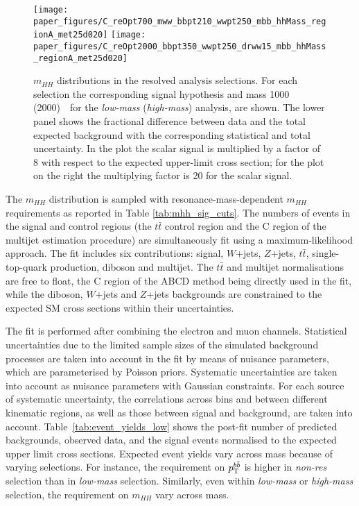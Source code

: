 \begin{figure}
\begin{center}
\texttt{[image: paper\_figures/C\_reOpt700\_mww\_bbpt210\_wwpt250\_mbb\_hhMass\_regionA\_met25d020]}
\texttt{[image: paper\_figures/C\_reOpt2000\_bbpt350\_wwpt250\_drww15\_mbb\_hhMass\_regionA\_met25d020]}
\end{center}
\caption{$m_{HH}$ distributions in the resolved analysis selections. For each selection the corresponding
 signal hypothesis and mass 1000 (2000)~\GeV\ for the  \emph{low-mass} (\emph{high-mass}) analysis, are shown.  The lower panel shows the fractional difference between data and the total expected background
 with the corresponding statistical and total uncertainty. In the plot the scalar signal is multiplied by a factor of 8 with respect to the expected upper-limit cross section;%
for the plot on the right
the multiplying factor is 20 for the scalar signal.}
\label{fig:mhh_2}
\end{figure}
 
 
The $m_{HH}$ distribution is sampled with resonance-mass-dependent
$m_{HH}$ requirements as reported in Table \ref{tab:mhh_sig_cuts}.
The numbers of events in the signal and control regions (the $t\bar{t}$
control region and the C region of the multijet estimation procedure) are
simultaneously fit using a  maximum-likelihood approach. The fit includes six contributions: signal, $W$+jets,
$Z$+jets, $t\bar{t}$, single-top-quark production, diboson and multijet. The
$t\bar{t}$ and multijet normalisations are free to float, the C
region of the ABCD method being directly used in the fit, while the
diboson, $W$+jets and $Z$+jets backgrounds are constrained
to the expected SM cross sections within their uncertainties.
 
The fit is performed after combining the electron and muon channels. Statistical uncertainties due to the limited
sample sizes of the simulated background processes are taken into
account in the fit by means of nuisance parameters, which are
parameterised by Poisson priors. Systematic uncertainties are taken into account as
nuisance parameters with Gaussian constraints. For each
source of systematic uncertainty, the correlations across bins and
between different kinematic regions, as well as those between signal
and background, are taken into account.
Table~\ref{tab:event_yields_low} shows
the post-fit number of predicted backgrounds, observed data, and the
signal events normalised to the expected upper limit cross
sections. Expected event yields vary across mass because of varying selections. For instance, the requirement on $p_{\rm T}^{b \bar{b}}$ is higher in \emph{non-res} selection than in \emph{low-mass} selection. Similarly, even within \emph{low-mass} or \emph{high-mass} selection, the requirement on $m_{HH}$ vary across mass.  
 
